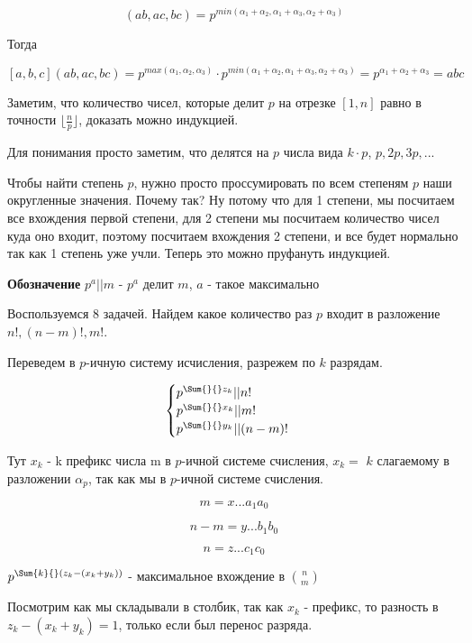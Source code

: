 $$(ab, ac, bc) = p^{min(\alpha_1 + \alpha_2, \alpha_1 + \alpha_3, \alpha_2 + \alpha_3)}$$

Тогда

$$[a, b, c](ab, ac, bc) = p^{max(\alpha_1, \alpha_2, \alpha_3)} \cdot p^{min(\alpha_1 + \alpha_2, \alpha_1 + \alpha_3, \alpha_2 + \alpha_3)} = p^{\alpha_1 + \alpha_2 + \alpha_3} = abc$$


Заметим, что количество чисел, которые делит $p$ на отрезке $[1, n]$ равно в точности $\lfloor \frac{n}{p} \rfloor$, доказать можно индукцией.

Для понимания просто заметим, что делятся на $p$ числа вида $k \cdot p$, $p, 2p, 3p, ...$

Чтобы найти степень $p$, нужно просто проссумировать по всем степеням $p$ наши округленные значения. Почему так? Ну потому что для 1 степени, мы посчитаем
все вхождения первой степени, для 2 степени мы посчитаем количество чисел куда оно входит, поэтому посчитаем вхождения 2 степени, и все будет нормально
так как 1 степень уже учли. Теперь это можно пруфануть индукцией.

\textbf{Обозначение} $p^a || m$ - $p^a$ делит $m$, $a$ - такое максимально


Воспользуемся 8 задачей. Найдем какое количество раз $p$ входит в разложение $n!, (n - m)!, m!$.

Переведем в $p$-ичную систему исчисления, разрежем по $k$ разрядам.

\begin{equation*}
    \begin{cases}
        p^{\Sum{}{}z_k} || n!\\
        p^{\Sum{}{}x_k} || m!\\
        p^{\Sum{}{}y_k} || (n - m)!\\
    \end{cases}
\end{equation*}

Тут $x_k$ - k префикс числа m в $p$-ичной системе счисления, $x_k =$ $k$ слагаемому в разложении $\alpha_p$, так как мы в $p$-ичной системе счисления.

$$m = x...a_1a_0$$

$$n - m = y...b_1b_0$$

$$n = z...c_1c_0$$

$p^{\Sum{k}{}(z_k - (x_k + y_k))}$ - максимальное вхождение в $\binom{n}{m}$

Посмотрим как мы складывали в столбик, так как $x_k$ - префикс, то разность в $z_k - (x_k + y_k) = 1$, только если был перенос разряда.

